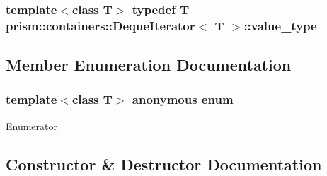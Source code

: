 \subsubsection[{\texorpdfstring{value\+\_\+type}{value_type}}]{\setlength{\rightskip}{0pt plus 5cm}template$<$class T$>$ typedef T {\bf prism\+::containers\+::\+Deque\+Iterator}$<$ T $>$\+::{\bf value\+\_\+type}}\hypertarget{classprism_1_1containers_1_1_deque_iterator_ac1b7df42a33124023e6251c457fb0f08}{}\label{classprism_1_1containers_1_1_deque_iterator_ac1b7df42a33124023e6251c457fb0f08}


\subsection{Member Enumeration Documentation}
\subsubsection[{\texorpdfstring{anonymous enum}{anonymous enum}}]{\setlength{\rightskip}{0pt plus 5cm}template$<$class T$>$ anonymous enum}\hypertarget{classprism_1_1containers_1_1_deque_iterator_a8d329a4cffd98b8e54cb549d11790596}{}\label{classprism_1_1containers_1_1_deque_iterator_a8d329a4cffd98b8e54cb549d11790596}
\begin{Desc}
\item[Enumerator]\par
\begin{description}
\item[{\em 
C\+H\+U\+N\+K\+\_\+\+S\+I\+ZE\hypertarget{classprism_1_1containers_1_1_deque_iterator_a8d329a4cffd98b8e54cb549d11790596a67b1ecf27d74afe920e8b0d01953df39}{}\label{classprism_1_1containers_1_1_deque_iterator_a8d329a4cffd98b8e54cb549d11790596a67b1ecf27d74afe920e8b0d01953df39}
}]\end{description}
\end{Desc}


\subsection{Constructor \& Destructor Documentation}
